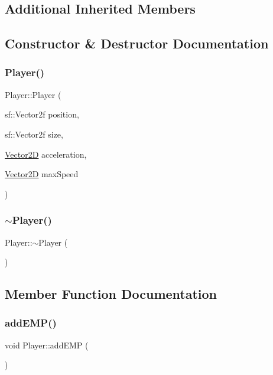 \subsection*{Additional Inherited Members}


\subsection{Constructor \& Destructor Documentation}
\hypertarget{class_player_a92008587897cd5b46c85e7d4df5f3b79}{}\label{class_player_a92008587897cd5b46c85e7d4df5f3b79} 
\subsubsection{\texorpdfstring{Player()}{Player()}}
{\footnotesize\ttfamily Player\+::\+Player (\begin{DoxyParamCaption}\item[{sf\+::\+Vector2f}]{position,  }\item[{sf\+::\+Vector2f}]{size,  }\item[{\hyperlink{class_vector2_d}{Vector2D}}]{acceleration,  }\item[{\hyperlink{class_vector2_d}{Vector2D}}]{max\+Speed }\end{DoxyParamCaption})}

\hypertarget{class_player_a749d2c00e1fe0f5c2746f7505a58c062}{}\label{class_player_a749d2c00e1fe0f5c2746f7505a58c062} 
\subsubsection{\texorpdfstring{$\sim$\+Player()}{~Player()}}
{\footnotesize\ttfamily Player\+::$\sim$\+Player (\begin{DoxyParamCaption}{ }\end{DoxyParamCaption})}



\subsection{Member Function Documentation}
\hypertarget{class_player_a0dfaa62ad3dddedec5fbaaa7c637c655}{}\label{class_player_a0dfaa62ad3dddedec5fbaaa7c637c655} 
\subsubsection{\texorpdfstring{add\+E\+M\+P()}{addEMP()}}
{\footnotesize\ttfamily void Player\+::add\+E\+MP (\begin{DoxyParamCaption}{ }\end{DoxyParamCaption})}

